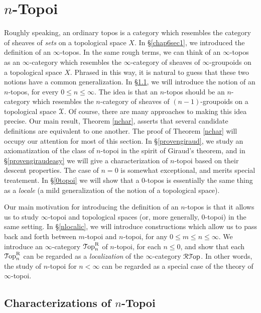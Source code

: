 \section{$n$-Topoi}\label{chap6sec3}

\setcounter{theorem}{0}

Roughly speaking, an ordinary topos is a category which resembles the category of sheaves of {\em sets} on a topological space $X$. In \S \ref{chap6sec1}, we introduced the definition of an $\infty$-topos. In the same rough terms, we can think of an $\infty$-topos as an $\infty$-category which resembles the $\infty$-category of sheaves of $\infty$-groupoids on a topological space $X$. Phrased in this way, it is natural to guess that these two notions have a common generalization. In \S \ref{c631}, we will introduce the notion of an $n$-topos, for every $0 \leq n \leq \infty$. The idea is that an $n$-topos should be an $n$-category which resembles the $n$-category of sheaves of $(n-1)$-groupoids on a topological space $\operatorname{\mathcal{X}}$. Of course, there are many approaches to making this idea precise. Our main result, Theorem \ref{nchar}, asserts that several candidate definitions are equivalent to one another. The proof of Theorem \ref{nchar} will occupy our attention for most of this section. In \S \ref{provengiraud}, we study an axiomatization of the class of $n$-topoi in the spirit of Giraud's theorem, and in \S \ref{provengiraudeasy} we will give a characterization of $n$-topoi based on their descent properties. The case of $n=0$ is somewhat exceptional, and merits special treatement. In \S \ref{0topoi} we will show that a $0$-topos is essentially the same thing as a {\em locale} (a mild generalization of the notion of a topological space). 

Our main motivation for introducing the definition of an $n$-topos is that it allows us to study $\infty$-topoi and topological spaces (or, more generally, $0$-topoi) in the same setting. In \S \ref{nlocalic}, we will introduce constructions which allow us to pass back and forth between $m$-topoi and $n$-topoi, for any $0 \leq m \leq n \leq \infty$. We introduce an $\infty$-category
$\operatorname{\mathcal{T}op}_{n}^{\operatorname{R}}$ of $n$-topoi, for each $n \leq 0$, and show that each
$\operatorname{\mathcal{T}op}_{n}^{\operatorname{R}}$ can be regarded as a {\em localization} of the $\infty$-category
$\operatorname{\mathcal{R}{\mathcal T}op}$. In other words, the study of $n$-topoi for $n < \infty$ can be regarded as a special case of the theory of $\infty$-topoi.

\subsection{Characterizations of $n$-Topoi}\label{c631}

